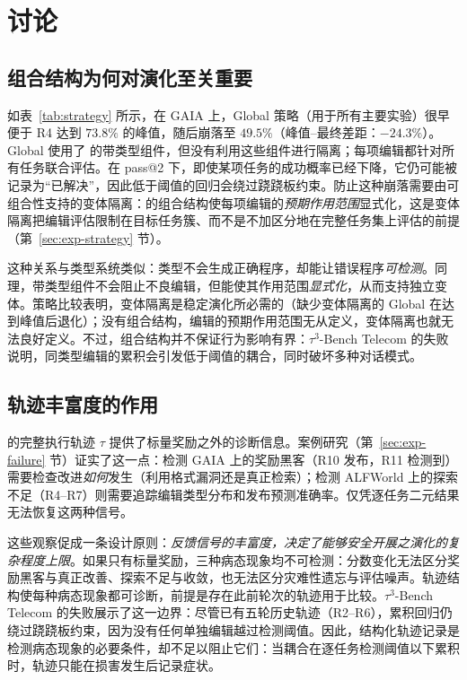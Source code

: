 \section{讨论}
\label{sec:discussion}

\subsection{组合结构为何对演化至关重要}

如表~\ref{tab:strategy} 所示，在 GAIA 上，Global 策略（用于所有主要实验）很早便于 R4 达到 $73.8\%$ 的峰值，随后崩落至 $49.5\%$（峰值--最终差距：$-24.3\%$）。Global 使用了 \ProjectName 的带类型组件，但没有利用这些组件进行隔离；每项编辑都针对所有任务联合评估。在 pass@2 下，即使某项任务的成功概率已经下降，它仍可能被记录为“已解决”，因此低于阈值的回归会绕过跷跷板约束。防止这种崩落需要由可组合性支持的变体隔离：\ProjectName 的组合结构使每项编辑的\emph{预期作用范围}显式化，这是变体隔离把编辑评估限制在目标任务簇、而不是不加区分地在完整任务集上评估的前提（第~\ref{sec:exp-strategy} 节）。

这种关系与类型系统类似：类型不会生成正确程序，却能让错误程序\emph{可检测}。同理，带类型组件不会阻止不良编辑，但能使其作用范围\emph{显式化}，从而支持独立变体。策略比较表明，变体隔离是稳定演化所必需的（缺少变体隔离的 Global 在达到峰值后退化）；没有组合结构，编辑的预期作用范围无从定义，变体隔离也就无法良好定义。不过，组合结构并不保证行为影响有界：$\tau^3$-Bench Telecom 的失败说明，同类型编辑的累积会引发低于阈值的耦合，同时破坏多种对话模式。

\subsection{轨迹丰富度的作用}

\ProjectName 的完整执行轨迹 $\tau$ 提供了标量奖励之外的诊断信息。案例研究（第~\ref{sec:exp-failure} 节）证实了这一点：检测 GAIA 上的奖励黑客（R10 发布，R11 检测到）需要检查改进\emph{如何}发生（利用格式漏洞还是真正检索）；检测 ALFWorld 上的探索不足（R4--R7）则需要追踪编辑类型分布和发布预测准确率。仅凭逐任务二元结果无法恢复这两种信号。

这些观察促成一条设计原则：\textit{反馈信号的丰富度，决定了能够安全开展之演化的复杂程度上限}。如果只有标量奖励，三种病态现象均不可检测：分数变化无法区分奖励黑客与真正改善、探索不足与收敛，也无法区分灾难性遗忘与评估噪声。轨迹结构使每种病态现象都可诊断，前提是存在此前轮次的轨迹用于比较。$\tau^3$-Bench Telecom 的失败展示了这一边界：尽管已有五轮历史轨迹（R2--R6），累积回归仍绕过跷跷板约束，因为没有任何单独编辑越过检测阈值。因此，结构化轨迹记录是检测病态现象的必要条件，却不足以阻止它们：当耦合在逐任务检测阈值以下累积时，轨迹只能在损害发生后记录症状。

